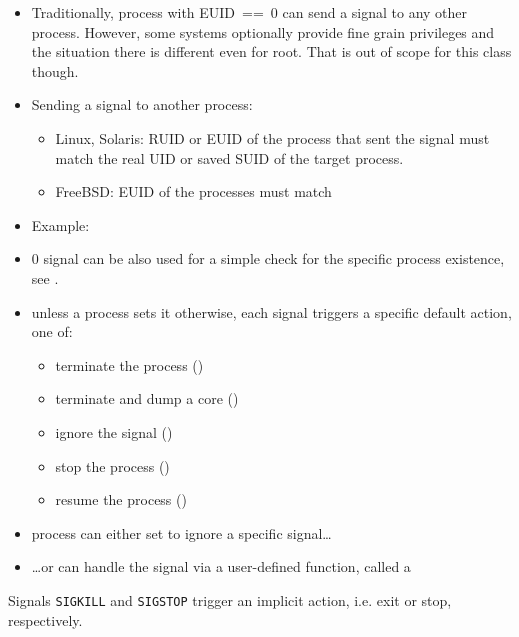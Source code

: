 \label{KILLSYSCALL}

\begin{itemize}
\item Traditionally, process with EUID~==~0 can send a signal to any other
process.  However, some systems optionally provide fine grain privileges and the
situation there is different even for root.  That is out of scope for this class
though.  \item Sending a signal to another process:
    \begin{itemize}
    \item Linux, Solaris: RUID or EUID of the process that sent the signal must
    match the real UID or saved SUID of the target process.
    \item FreeBSD: EUID of the processes must match
    \end{itemize}
\item Example: 
\item 0 signal can be also used for a simple check for the specific process
existence, see .
\end{itemize}



\begin{slide}
\begin{itemize}
\item unless a process sets it otherwise, each signal triggers a specific
default action, one of:
    \begin{itemize}
    \item terminate the process () 
    \item terminate and dump a core ()
    \item ignore the signal ()
    \item stop the process ()
    \item resume the process () 
    \end{itemize}
\item process can either set to ignore a specific signal\dots
\item \dots{}or can handle the signal via a user-defined function,
called a 
\end{itemize}

Signals \texttt{SIGKILL} and \texttt{SIGSTOP}  trigger an implicit
action, i.e. exit or stop, respectively.
\end{slide}

